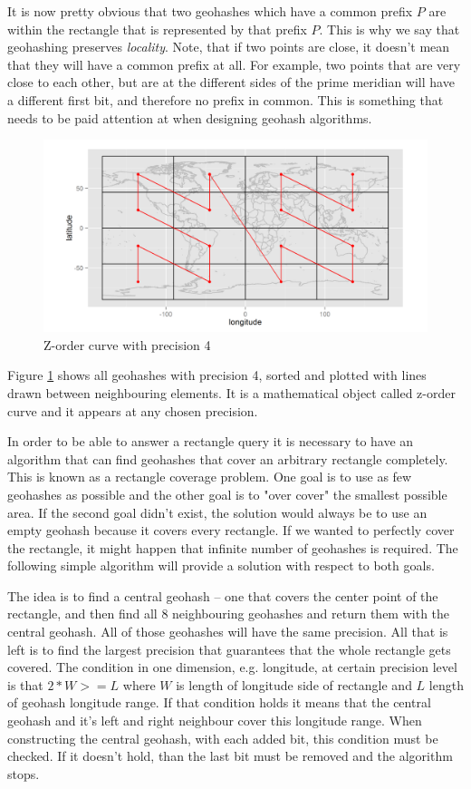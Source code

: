 \documentclass[times, utf8, diplomski]{fer}
\begin{document}
It is now pretty obvious that two geohashes which have a common prefix $P$ are within the rectangle that is represented by that prefix $P$. This is why we say that geohashing preserves \emph{locality}. Note, that if two points are close, it doesn't mean that they will have a common prefix at all. For example, two points that are very close to each other, but are at the different sides of the prime meridian will have a different first bit, and therefore no prefix in common. This is something that needs to be paid attention at when designing geohash algorithms.

\begin{figure}[h]
\includegraphics[width=\textwidth]{z_curve}
\caption{Z-order curve with precision 4 \cite {spatiotemporal}}
\label{fig:zcurve}
\end{figure}

Figure \ref{fig:zcurve} shows all geohashes with precision 4, sorted and plotted with lines drawn between neighbouring elements. It is a mathematical object called z-order curve \cite{zcurve} and it appears at any chosen precision.

In order to be able to answer a rectangle query it is necessary to have an algorithm that can find geohashes that cover an arbitrary rectangle completely. This is known as a rectangle coverage problem. One goal is to use as few geohashes as possible and the other goal is to "over cover" the smallest possible area. If the second goal didn't exist, the solution would always be to use an empty geohash because it covers every rectangle. If we wanted to perfectly cover the rectangle, it might happen that infinite number of geohashes is required. The following simple algorithm will provide a solution with respect to both goals.

The idea is to find a central geohash -- one that covers the center point of the rectangle, and then find all 8 neighbouring geohashes and return them with the central geohash. All of those geohashes will have the same precision. All that is left is to find the largest precision that guarantees that the whole rectangle gets covered. The condition in one dimension, e.g. longitude, at certain precision level is that $2*W >= L$ where $W$ is length of longitude side of rectangle and $L$ length of geohash longitude range. If that condition holds it means that the central geohash and it's left and right neighbour cover this longitude range. When constructing the central geohash, with each added bit, this condition must be checked. If it doesn't hold, than the last bit must be removed and the algorithm stops.
\end{document}
